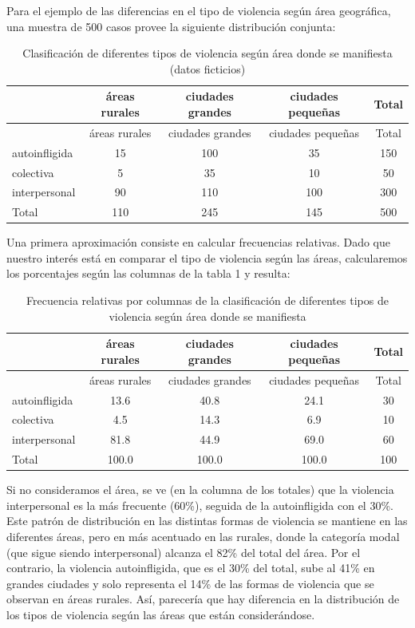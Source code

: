 \documentclass[]{book}
\begin{document}
Para el ejemplo de las diferencias en el tipo de violencia según área
geográfica, una muestra de 500 casos provee la siguiente distribución
conjunta:

\begin{longtable}[]{@{}lcccc@{}}
\caption{\label{tab:frecObs}Clasificación de diferentes tipos de violencia según área donde se manifiesta (datos ficticios)}\tabularnewline
\toprule
& áreas rurales & ciudades grandes & ciudades pequeñas & Total\tabularnewline
\midrule
\endfirsthead
\toprule
& áreas rurales & ciudades grandes & ciudades pequeñas & Total\tabularnewline
\midrule
\endhead
autoinfligida & 15 & 100 & 35 & 150\tabularnewline
colectiva & 5 & 35 & 10 & 50\tabularnewline
interpersonal & 90 & 110 & 100 & 300\tabularnewline
Total & 110 & 245 & 145 & 500\tabularnewline
\bottomrule
\end{longtable}

Una primera aproximación consiste en calcular frecuencias relativas.
Dado que nuestro interés está en comparar el tipo de violencia según las
áreas, calcularemos los porcentajes según las columnas de la tabla 1 y
resulta:

\begin{longtable}[]{@{}lcccc@{}}
\caption{\label{tab:unnamed-chunk-136}Frecuencia relativas por columnas de la clasificación de diferentes tipos de violencia según área donde se manifiesta}\tabularnewline
\toprule
& áreas rurales & ciudades grandes & ciudades pequeñas & Total\tabularnewline
\midrule
\endfirsthead
\toprule
& áreas rurales & ciudades grandes & ciudades pequeñas & Total\tabularnewline
\midrule
\endhead
autoinfligida & 13.6 & 40.8 & 24.1 & 30\tabularnewline
colectiva & 4.5 & 14.3 & 6.9 & 10\tabularnewline
interpersonal & 81.8 & 44.9 & 69.0 & 60\tabularnewline
Total & 100.0 & 100.0 & 100.0 & 100\tabularnewline
\bottomrule
\end{longtable}

Si no consideramos el área, se ve (en la columna de los totales) que la
violencia interpersonal es la más frecuente (60\%), seguida de la
autoinfligida con el 30\%. Este patrón de distribución en las distintas
formas de violencia se mantiene en las diferentes áreas, pero en más
acentuado en las rurales, donde la categoría modal (que sigue siendo
interpersonal) alcanza el 82\% del total del área. Por el contrario, la
violencia autoinfligida, que es el 30\% del total, sube al 41\% en grandes
ciudades y solo representa el 14\% de las formas de violencia que se
observan en áreas rurales. Así, parecería que hay diferencia en la
distribución de los tipos de violencia según las áreas que están
considerándose.
\end{document}

